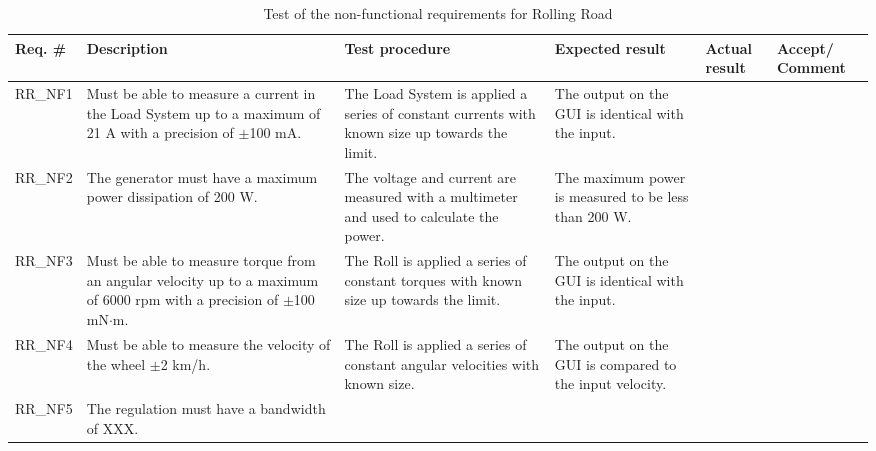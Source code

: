 \begin{table}[h!]
	\centering
	\label{my-label}
	\begin{tabular}{|p{1.5 cm}|p{2.1 cm}|p{2.1 cm}|p{2.1 cm}|p{2.1 cm}|p{2.1 cm}|}
		\hline
		\textbf{Req. \#} & \textbf{Description} & \textbf{Test procedure} & 
		\textbf{Expected result} & \textbf{Actual result} & \textbf{Accept/ Comment} \\ \hline
		RR\_NF1 
			& Must be able to measure a current in the Load System up to a maximum of 21 A with a precision of $\pm$100 mA.
			& The Load System is applied a series of constant currents with known size up towards the limit.
			& The output on the GUI is identical with the input.
			& 
			& \\ \hline
		RR\_NF2 
			& The generator must have a maximum power dissipation of 200 W.
			& The voltage and current are measured with a multimeter and used to calculate the power.
			& The maximum power is measured to be less than 200 W.
			&
			& \\ \hline
		RR\_NF3 
			& Must be able to measure torque from an angular velocity up to a maximum of 6000 rpm with a precision of $\pm$100 mN$\cdot$m.
			& The Roll is applied a series of constant torques with known size up towards the limit.
			& The output on the GUI is identical with the input.
			& 
			& \\ \hline
		RR\_NF4 
			& Must be able to measure the velocity of the wheel $\pm$2 km/h.
			& The Roll is applied a series of constant angular velocities with known size.
			& The output on the GUI is compared to the input velocity.
			& 
			& \\ \hline
		RR\_NF5 
			& The regulation must have a bandwidth of XXX.
			& 
			& 
			& 
			& \\ \hline
	\end{tabular}
	\caption{Test of the non-functional requirements for Rolling Road}
\end{table}